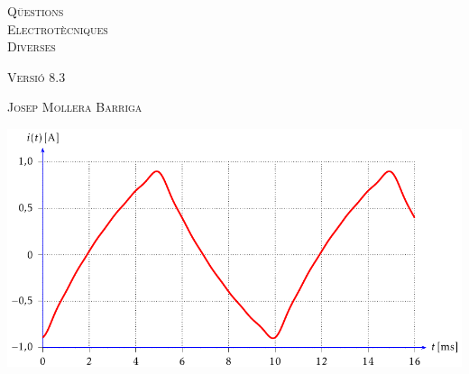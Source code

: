 \begin{titlepage}

   \parbox{18cm}{\fontsize{60pt}{60pt}\selectfont\color{NavyBlue}\scshape%
                 Q\"{u}estions\\[30pt] Electrot\`{e}cniques\\[30pt] Diverses}

   \vspace*{1.8cm}
   {\fontsize{30pt}{30pt}\selectfont\textsc{Versi\'{o} 8.3}}

   \vspace*{1.5cm}
   {\fontsize{40pt}{40pt}\selectfont\textsc{Josep Mollera Barriga}}

   \vspace*{1cm}
   \centering
   \includegraphics{Imatges/Cap-Fourier-Exemple-Corrent.pdf}

\end{titlepage}

